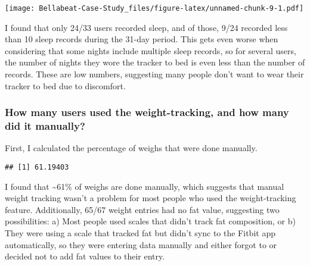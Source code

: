 \documentclass[
]{article}
\newenvironment{Shaded}{\begin{snugshade}}{\end{snugshade}}
\newcommand{\AttributeTok}[1]{\textcolor[rgb]{0.13,0.29,0.53}{#1}}
\newcommand{\CommentTok}[1]{\textcolor[rgb]{0.56,0.35,0.01}{\textit{#1}}}
\newcommand{\ConstantTok}[1]{\textcolor[rgb]{0.56,0.35,0.01}{#1}}
\newcommand{\DecValTok}[1]{\textcolor[rgb]{0.00,0.00,0.81}{#1}}
\newcommand{\FunctionTok}[1]{\textcolor[rgb]{0.13,0.29,0.53}{\textbf{#1}}}
\newcommand{\NormalTok}[1]{#1}
\newcommand{\OtherTok}[1]{\textcolor[rgb]{0.56,0.35,0.01}{#1}}
\newcommand{\SpecialCharTok}[1]{\textcolor[rgb]{0.81,0.36,0.00}{\textbf{#1}}}
\begin{document}
\texttt{[image: Bellabeat-Case-Study\_files/figure-latex/unnamed-chunk-9-1.pdf]}

I found that only 24/33 users recorded sleep, and of those, 9/24
recorded less than 10 sleep records during the 31-day period. This gets
even worse when considering that some nights include multiple sleep
records, so for several users, the number of nights they wore the
tracker to bed is even less than the number of records. These are low
numbers, suggesting many people don't want to wear their tracker to bed
due to discomfort.

\hypertarget{how-many-users-used-the-weight-tracking-and-how-many-did-it-manually}{%
\subsubsection{How many users used the weight-tracking, and how many did
it
manually?}\label{how-many-users-used-the-weight-tracking-and-how-many-did-it-manually}}

First, I calculated the percentage of weighs that were done manually.

\begin{Shaded}
\end{Shaded}

\begin{verbatim}
## [1] 61.19403
\end{verbatim}

I found that \textasciitilde61\% of weighs are done manually, which
suggests that manual weight tracking wasn't a problem for most people
who used the weight-tracking feature. Additionally, 65/67 weight entries
had no fat value, suggesting two possibilities: a) Most people used
scales that didn't track fat composition, or b) They were using a scale
that tracked fat but didn't sync to the Fitbit app automatically, so
they were entering data manually and either forgot to or decided not to
add fat values to their entry.
\end{document}

